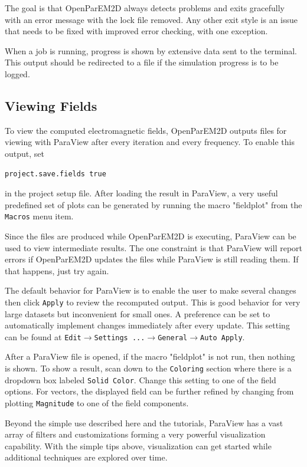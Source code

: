 \documentclass[titlepage]{article}
\renewcommand\_{\textunderscore\linebreak[1]}
\begin{document}
The goal is that OpenParEM2D always detects problems and exits gracefully with an error message with the lock file removed.  Any other exit style is an issue that needs to be fixed with improved error checking, with one exception.

When a job is running, progress is shown by extensive data sent to the terminal.  This output should be redirected to a file if the simulation progress is to be logged.

\subsection{Viewing Fields}

To view the computed electromagnetic fields, OpenParEM2D outputs files for viewing with ParaView after every iteration and every frequency.  To enable this output, set
\begin{Verbatim}[fontsize=\small]
  project.save.fields true
\end{Verbatim}
\noindent in the project setup file.  After loading the result in ParaView, a very useful predefined set of plots can be generated by running the macro "field\_plot" from the \texttt{Macros} menu item.

Since the files are produced while OpenParEM2D is executing, ParaView can be used to view intermediate results.  The one constraint is that ParaView will report errors if OpenParEM2D updates the files while ParaView is still reading them.  If that happens, just try again.

The default behavior for ParaView is to enable the user to make several changes then click \texttt{Apply} to review the recomputed output.  This is good behavior for very large datasets but inconvenient for small ones.  A preference can be set to automatically implement changes immediately after every update.  This setting can be found at \texttt{Edit}$\rightarrow$\texttt{Settings ...}$\rightarrow$\texttt{General}$\rightarrow$\texttt{Auto Apply}.

After a ParaView file is opened, if the macro "field\_plot" is not run, then nothing is shown.  To show a result, scan down to the \texttt{Coloring} section where there is a dropdown box labeled \texttt{Solid Color}.  Change this setting to one of the field options.  For vectors, the displayed field can be further refined by changing from plotting \texttt{Magnitude} to one of the field components.


Beyond the simple use described here and the tutorials, ParaView has a vast array of filters and customizations forming a very powerful visualization capability. With the simple tips above, visualization can get started while additional techniques are explored over time.
\end{document}
